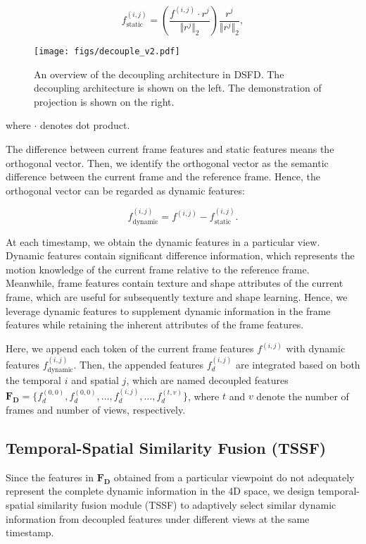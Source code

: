 \begin{equation}
  \label{eq1}
  f_{\text{static}}^{(i,j)}=(\frac{f^{(i,j)}\cdot r^{j}}{\Vert r^{j}\Vert_2})\frac{r^{j}}{\Vert r^{j}\Vert_2}, 
\end{equation} 

\begin{figure}[t]%
\centering
\texttt{[image: figs/decouple\_v2.pdf]}
\caption{An overview of the decoupling architecture in DSFD. The decoupling architecture is shown on the left. The demonstration of projection is shown on the right.}\label{decouple}
\end{figure}

where $\cdot$ denotes dot product.

The difference between current frame features and static features means the orthogonal vector. Then, we identify the orthogonal vector as the semantic difference between the current frame and the reference frame. Hence, the orthogonal vector can be regarded as dynamic features:



\begin{equation}
  \label{eq2}
  f_{\text{dynamic}}^{(i,j)}=f^{(i,j)}-f_{\text{static}}^{(i,j)}. 
\end{equation} 


At each timestamp, we obtain the dynamic features in a particular view. Dynamic features contain significant difference information, which represents the motion knowledge of the current frame relative to the reference frame. Meanwhile, frame features contain texture and shape attributes of the current frame, which are useful for subsequently texture and shape learning. Hence, we leverage dynamic features to supplement dynamic information in the frame features while retaining the inherent attributes of the frame features. 

Here, we append each token of the current frame features $f^{(i,j)}$ with dynamic features $f_{\text{dynamic}}^{(i,j)}$. Then, the appended features $f_d^{(i,j)}$ are integrated based on both the temporal $i$ and spatial $j$, which are named decoupled features $\textbf{F}_{\textbf{D}}=\{f_d^{(0,0)},f_d^{(0,0)},\dots,f_d^{(i,j)},\dots,f_d^{(t,v)}\}$, where $t$ and $v$ denote the number of frames and number of views, respectively.



\subsection{Temporal-Spatial Similarity Fusion (TSSF)} \label{tscf} %
Since the features in $\textbf{F}_{\textbf{D}}$ obtained from a particular viewpoint do not adequately represent the complete dynamic information in the 4D space, we design temporal-spatial similarity fusion module (TSSF) to adaptively select similar dynamic information from decoupled features under different views at the same timestamp.


